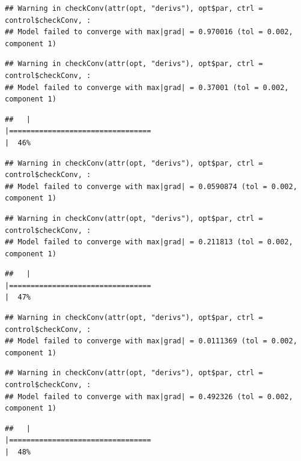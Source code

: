 \documentclass[
  12pt,
]{book}
\begin{document}
\begin{verbatim}
## Warning in checkConv(attr(opt, "derivs"), opt$par, ctrl = control$checkConv, :
## Model failed to converge with max|grad| = 0.970016 (tol = 0.002, component 1)
\end{verbatim}

\begin{verbatim}
## Warning in checkConv(attr(opt, "derivs"), opt$par, ctrl = control$checkConv, :
## Model failed to converge with max|grad| = 0.37001 (tol = 0.002, component 1)
\end{verbatim}

\begin{verbatim}
##   |                                                                              |=================================                                     |  46%
\end{verbatim}

\begin{verbatim}
## Warning in checkConv(attr(opt, "derivs"), opt$par, ctrl = control$checkConv, :
## Model failed to converge with max|grad| = 0.0590874 (tol = 0.002, component 1)
\end{verbatim}

\begin{verbatim}
## Warning in checkConv(attr(opt, "derivs"), opt$par, ctrl = control$checkConv, :
## Model failed to converge with max|grad| = 0.211813 (tol = 0.002, component 1)
\end{verbatim}

\begin{verbatim}
##   |                                                                              |=================================                                     |  47%
\end{verbatim}

\begin{verbatim}
## Warning in checkConv(attr(opt, "derivs"), opt$par, ctrl = control$checkConv, :
## Model failed to converge with max|grad| = 0.0111369 (tol = 0.002, component 1)
\end{verbatim}

\begin{verbatim}
## Warning in checkConv(attr(opt, "derivs"), opt$par, ctrl = control$checkConv, :
## Model failed to converge with max|grad| = 0.492326 (tol = 0.002, component 1)
\end{verbatim}

\begin{verbatim}
##   |                                                                              |=================================                                     |  48%
\end{verbatim}
\end{document}
